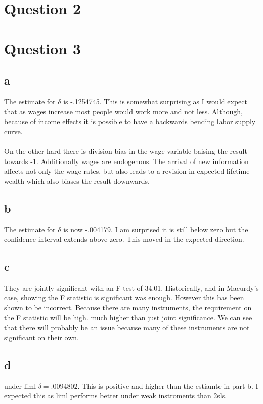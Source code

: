 \documentclass[11pt]{article}
\begin{document}
\section{Question 2}





\section{Question 3}
\subsection{a}
The estimate for $\delta$ is -.1254745. This is somewhat surprising as I would expect that as wages increase most people would work more and not less. Although, because of income effects it is possible to have a backwards bending labor supply curve. 
\\ \\ 

On the other hard there is division bias in the wage variable baising the result towards -1. Additionally wages are endogenous. The arrival of new information affects not only the wage rates, but also leads to a revision in expected lifetime wealth which also biases the result downwards. 

\subsection{b}
The estimate for $\delta$ is now -.004179. I am surprised it is still below zero but the confidence interval extends above zero. This moved in the expected direction. 
\subsection{c}
 They are jointly significant with an F test of  34.01. Historically, and in Macurdy's case, showing the F statistic is significant was enough. However this has been shown to be incorrect. Because there are many instruments, the requirement on the F statistic will be high. much higher than just joint significance. We can see that there will probably be an issue because many of these instruments are not significant on their own. 
 
 
 \subsection{d}
 under liml $\delta = .0094802 $. This is positive and higher than the estiamte in part b. I expected this as liml performs better under weak instroments than 2sls.
 
\end{document}
